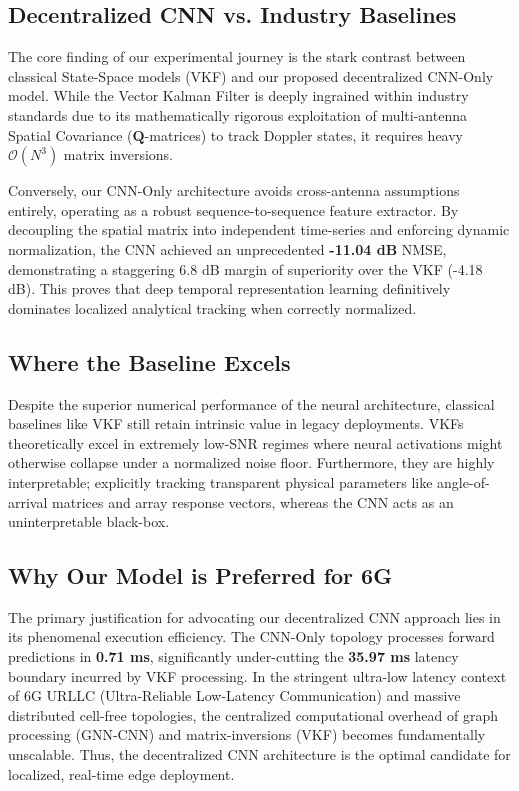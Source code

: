 \documentclass[12pt,a4paper]{article}
\begin{document}
\subsection{Decentralized CNN vs. Industry Baselines}
The core finding of our experimental journey is the stark contrast between classical State-Space models (VKF) and our proposed decentralized CNN-Only model. While the Vector Kalman Filter is deeply ingrained within industry standards due to its mathematically rigorous exploitation of multi-antenna Spatial Covariance ($\mathbf{Q}$-matrices) to track Doppler states, it requires heavy $\mathcal{O}(N^3)$ matrix inversions. 

Conversely, our CNN-Only architecture avoids cross-antenna assumptions entirely, operating as a robust sequence-to-sequence feature extractor. By decoupling the spatial matrix into independent time-series and enforcing dynamic normalization, the CNN achieved an unprecedented \textbf{-11.04 dB} NMSE, demonstrating a staggering 6.8 dB margin of superiority over the VKF (-4.18 dB). This proves that deep temporal representation learning definitively dominates localized analytical tracking when correctly normalized.

\subsection{Where the Baseline Excels}
Despite the superior numerical performance of the neural architecture, classical baselines like VKF still retain intrinsic value in legacy deployments. VKFs theoretically excel in extremely low-SNR regimes where neural activations might otherwise collapse under a normalized noise floor. Furthermore, they are highly interpretable; explicitly tracking transparent physical parameters like angle-of-arrival matrices and array response vectors, whereas the CNN acts as an uninterpretable black-box.

\subsection{Why Our Model is Preferred for 6G}
The primary justification for advocating our decentralized CNN approach lies in its phenomenal execution efficiency. The CNN-Only topology processes forward predictions in \textbf{0.71 ms}, significantly under-cutting the \textbf{35.97 ms} latency boundary incurred by VKF processing. In the stringent ultra-low latency context of 6G URLLC (Ultra-Reliable Low-Latency Communication) and massive distributed cell-free topologies, the centralized computational overhead of graph processing (GNN-CNN) and matrix-inversions (VKF) becomes fundamentally unscalable. Thus, the decentralized CNN architecture is the optimal candidate for localized, real-time edge deployment.
\end{document}
